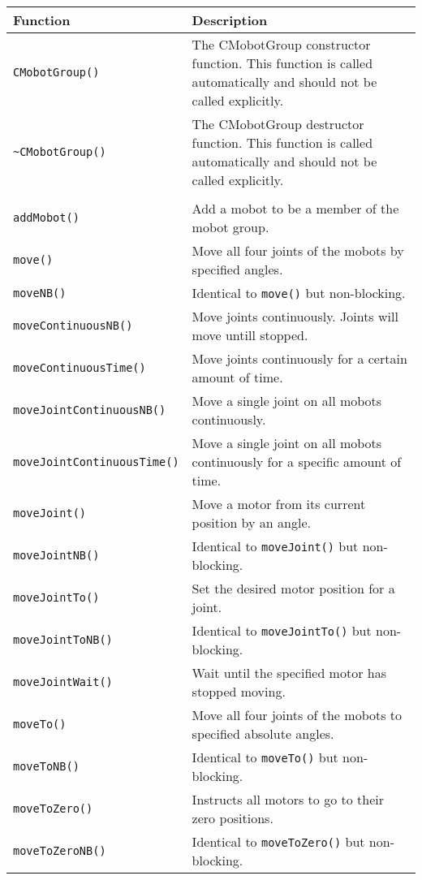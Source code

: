 \begin{tabular}{p{1.75in}p{4.5in}}
\hline
Function & Description \\
\hline
\texttt{CMobotGroup()} & The CMobotGroup constructor function. This function
is called automatically and should not be called explicitly. \\
\texttt{\textasciitilde CMobotGroup()} & The CMobotGroup destructor function. This function
is called automatically and should not be called explicitly. \\
& \\
\texttt{addMobot()} & Add a mobot to be a member of the mobot group. \\
\texttt{move()} & Move all four joints of the mobots by specified angles. \\
\texttt{moveNB()} & Identical to \texttt{move()} but non-blocking. \\
\texttt{moveContinuousNB()} & Move joints continuously. Joints will move untill stopped.\\
\texttt{moveContinuousTime()} & Move joints continuously for a certain amount of time.\\
\texttt{moveJointContinuousNB()} & Move a single joint on all mobots continuously. \\
\texttt{moveJointContinuousTime()} & Move a single joint on all mobots continuously for a specific amount of time. \\
\texttt{moveJoint()} & Move a motor from its current position by an angle. \\
\texttt{moveJointNB()} & Identical to \texttt{moveJoint()} but non-blocking. \\
\texttt{moveJointTo()} & Set the desired motor position for a joint. \\
\texttt{moveJointToNB()} & Identical to \texttt{moveJointTo()} but non-blocking. \\
\texttt{moveJointWait()} & Wait until the specified motor has stopped moving. \\
\texttt{moveTo()} & Move all four joints of the mobots to specified absolute angles. \\
\texttt{moveToNB()} & Identical to \texttt{moveTo()} but non-blocking. \\
\texttt{moveToZero()} & Instructs all motors to go to their zero positions. \\
\texttt{moveToZeroNB()} & Identical to \texttt{moveToZero()} but non-blocking. \\

\end{tabular}
